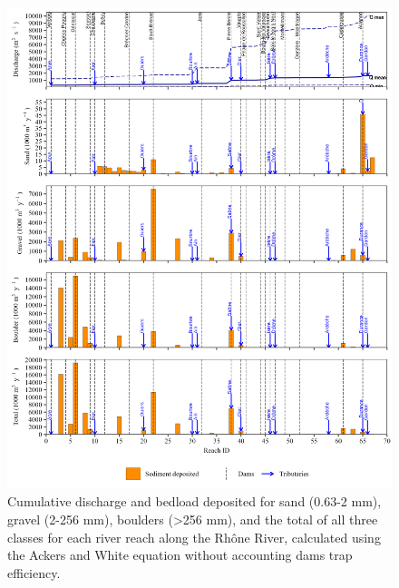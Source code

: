 \documentclass[
]{book}
\begin{document}
\begin{figure}
\includegraphics[width=26.24in]{img/res_cascade/res_E2_eA&W/plots_dep-silt/dep_res_sum_hy_E2_eA&W} \caption{Cumulative discharge and bedload deposited for sand (0.63-2 mm), gravel (2-256 mm), boulders (>256 mm), and the total of all three classes for each river reach along the Rhône River, calculated using the Ackers and White equation without accounting dams trap efficiency.}\label{fig:DepE2eA}
\end{figure}
\end{document}
